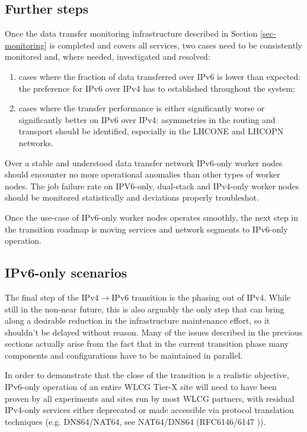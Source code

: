 \subsection{Further steps}
Once the data transfer monitoring infrastructure described in Section
\ref{sec-monitoring} is completed and covers all services, two cases
need to be consistently monitored and, where needed, investigated
and resolved:
\begin{enumerate}
\item cases where the fraction of data transferred over IPv6 is lower than expected:
the preference for IPv6 over IPv4 has to established throughout the system;
\item cases where the transfer performance is either significantly worse 
or significantly better on IPv6 over IPv4: asymmetries in the routing and
transport should be identified, especially in the LHCONE and LHCOPN networks.
\end{enumerate}
\par
Over a stable and understood data transfer network 
IPv6-only worker nodes should encounter no more operational anomalies
than other types of worker nodes. The 
job failure rate on IPV6-only, dual-stack and IPv4-only worker nodes should
be monitored statistically and deviations properly troubleshot.
\par
Once the use-case of IPv6-only worker nodes operates smoothly, the next
step in the transition roadmap is moving services and network segments to
IPv6-only operation.

\subsection{IPv6-only scenarios}
The final step of the IPv4$\rightarrow$IPv6 transition is the phasing out of
IPv4. While still in the non-near future, this is also arguably the only step
that can bring along a desirable reduction
in the infrastructure maintenance effort, so it shouldn't be delayed
without reason. Many of the issues described in the previous sections 
actually arise
from the fact that in the current transition phase many components and
configurations have to be maintained in parallel.
\par
In order to demonstrate that the close of the transition is a realistic
objective, IPv6-only operation of an entire WLCG Tier-X site will
need to have been proven by all experiments and sites run by most WLCG
partners, with residual IPv4-only services either deprecated or made
accessible via protocol translation techniques (e.g. DNS64/NAT64, see
NAT64/DNS64 (RFC6146/6147 \cite{rfc})). 
\par

